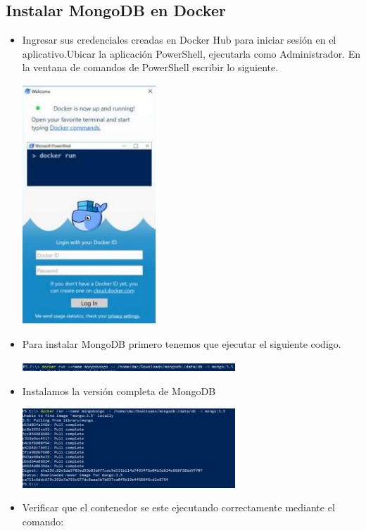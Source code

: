 \documentclass[%
 reprint,
 amsmath,amssymb,
 aps,
]{revtex4-1}
\begin{document}
\subsection{Instalar MongoDB en Docker}
                     \begin{itemize}
                     \item Ingresar sus credenciales creadas en Docker Hub para iniciar sesión en el aplicativo.Ubicar la aplicación PowerShell, ejecutarla como Administrador. En la ventana de comandos de PowerShell escribir lo siguiente.
                     \begin{center}
		\includegraphics[width=5cm]{./Imagenes/8}
		\end{center}	
		\item Para instalar MongoDB primero tenemos que ejecutar el siguiente codigo.
                     \begin{center}
		\includegraphics[width=8cm]{./Imagenes/6}
		\end{center}	
		\item Instalamos la versión completa de MongoDB
                      \begin{center}
		\includegraphics[width=8cm]{./Imagenes/7}
		\end{center}	
		\item Verificar que el contenedor se este ejecutando correctamente mediante el comando:

\end{itemize}
\end{document}
